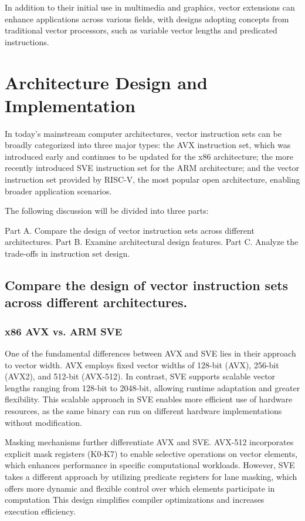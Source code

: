 \documentclass[conference]{IEEEtran}
\begin{document}
In addition to their initial use in multimedia and graphics, vector extensions can enhance applications across various fields, with designs adopting concepts from traditional vector processors, such as variable vector lengths and predicated instructions.


\section{Architecture Design and Implementation}
In today's mainstream computer architectures, 
vector instruction sets can be broadly categorized into three major types: 
the AVX instruction set, which was introduced early and continues to be updated 
for the x86 architecture; the more recently introduced SVE instruction set for the ARM architecture; 
and the vector instruction set provided by RISC-V, the most popular open architecture, 
enabling broader application scenarios.

The following discussion will be divided into three parts:

Part A. Compare the design of vector instruction sets across different architectures.
Part B. Examine architectural design features.
Part C. Analyze the trade-offs in instruction set design.


\subsection{Compare the design of vector instruction sets across different architectures.}
\subsubsection{x86 AVX vs. ARM SVE}

One of the fundamental differences between AVX and SVE lies in their approach to vector width. 
AVX employs fixed vector widths of 128-bit (AVX), 256-bit (AVX2), and 512-bit (AVX-512)\cite{b13}. 
In contrast, SVE supports scalable vector lengths ranging from 128-bit to 2048-bit, 
allowing runtime adaptation and greater flexibility\cite{b15}. 
This scalable approach in SVE enables more efficient use of hardware resources, as the same binary 
can run on different hardware implementations without modification.

Masking mechanisms further differentiate AVX and SVE. AVX-512 incorporates explicit mask registers (K0-K7) to enable selective operations on vector elements, which enhances performance in specific computational workloads\cite{b13}. However, SVE takes a different approach by utilizing predicate registers for lane masking, which offers more dynamic and flexible control over which elements participate in computation\cite{b16} This design simplifies compiler optimizations and increases execution efficiency.
\end{document}
